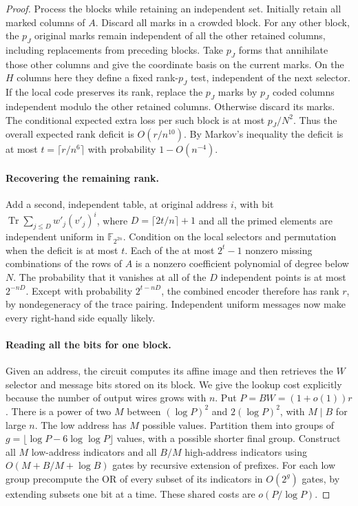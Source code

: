 \begin{proof}
Process the blocks while retaining an independent set. Initially retain all marked columns of $A$. Discard all marks in a crowded block. For any other block, the $p_J$ original marks remain independent of all the other retained columns, including replacements from preceding blocks. Take $p_J$ forms that annihilate those other columns and give the coordinate basis on the current marks. On the $H$ columns here they define a fixed rank-$p_J$ test, independent of the next selector. If the local code preserves its rank, replace the $p_J$ marks by $p_J$ coded columns independent modulo the other retained columns. Otherwise discard its marks. The conditional expected extra loss per such block is at most $p_J/N^2$. Thus the overall expected rank deficit is $O(r/n^{10})$. By Markov's inequality the deficit is at most $t=\lceil r/n^6\rceil$ with probability $1-O(n^{-4})$.

\paragraph{Recovering the remaining rank.}
Add a second, independent table, at original address $i$, with bit
$\operatorname{Tr}\sum_{j\le D} w'_j (v'_j)^i$, where $D=\lceil 2t/n\rceil+1$ and all the primed elements are independent uniform in $\mathbb F_{2^{2n}}$. Condition on the local selectors and permutation when the deficit is at most $t$. Each of the at most $2^t-1$ nonzero missing combinations of the rows of $A$ is a nonzero coefficient polynomial of degree below $N$. The probability that it vanishes at all of the $D$ independent points is at most $2^{-nD}$. Except with probability $2^{t-nD}$, the combined encoder therefore has rank $r$, by nondegeneracy of the trace pairing. Independent uniform messages now make every right-hand side equally likely.

\paragraph{Reading all the bits for one block.}
Given an address, the circuit computes its affine image and then retrieves the $W$ selector and message bits stored on its block. We give the lookup cost explicitly because the number of output wires grows with $n$. Put $P=BW=(1+o(1))r$. There is a power of two $M$ between $(\log P)^2$ and $2(\log P)^2$, with $M\mid B$ for large $n$. The low address has $M$ possible values. Partition them into groups of $g=\lfloor\log P-6\log\log P\rfloor$ values, with a possible shorter final group. Construct all $M$ low-address indicators and all $B/M$ high-address indicators using $O(M+B/M+\log B)$ gates by recursive extension of prefixes. For each low group precompute the OR of every subset of its indicators in $O(2^g)$ gates, by extending subsets one bit at a time. These shared costs are $o(P/\log P)$.


\end{proof}
